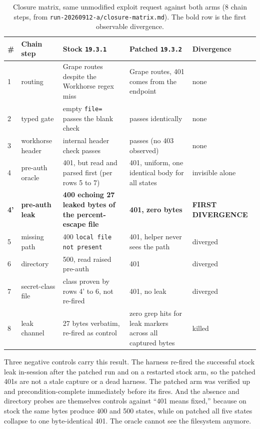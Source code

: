 \documentclass[journal]{IEEEtran}
\begin{document}
\begin{table}[t]
\caption{Closure matrix, same unmodified exploit request against both arms
(8 chain steps, from \texttt{run-20260912-a/closure-matrix.md}). The bold row
is the first observable divergence.}
\centering
\footnotesize
\begin{tabular}{p{0.35cm}p{2.0cm}p{4.55cm}p{4.55cm}p{2.45cm}}
\toprule
\# & Chain step & Stock \texttt{19.3.1} & Patched \texttt{19.3.2} & Divergence \\
\midrule
1 & routing & Grape routes despite the Workhorse regex miss & Grape routes, 401
comes from the endpoint & none \\
2 & typed gate & empty \texttt{file=} passes the blank check & passes
identically & none \\
3 & workhorse header & internal header check passes & passes (no 403 observed)
& none \\
4 & pre-auth oracle & 401, but read and parsed first (per rows 5 to 7) & 401,
uniform, one identical body for all states & invisible alone \\
\textbf{4'} & \textbf{pre-auth leak} & \textbf{400 echoing 27 leaked bytes of
the percent-escape file} & \textbf{401, zero bytes} & \textbf{FIRST
DIVERGENCE} \\
5 & missing path & 400 \texttt{local file not present} & 401, helper never
sees the path & diverged \\
6 & directory & 500, read raised pre-auth & 401 & diverged \\
7 & secret-class file & class proven by rows 4' to 6, not re-fired & 401, no
leak & diverged \\
8 & leak channel & 27 bytes verbatim, re-fired as control & zero grep hits for
leak markers across all captured bytes & killed \\
\bottomrule
\end{tabular}
\label{tab:closure}
\end{table}

Three negative controls carry this result. The harness re-fired the successful
stock leak in-session after the patched run and on a restarted stock arm, so
the patched 401s are not a stale capture or a dead harness. The patched arm was
verified up and precondition-complete immediately before its fires. And the
absence and directory probes are themselves controls against ``401 means
fixed,'' because on stock the same bytes produce 400 and 500 states, while on
patched all five states collapse to one byte-identical 401. The oracle cannot
see the filesystem anymore.
\end{document}
